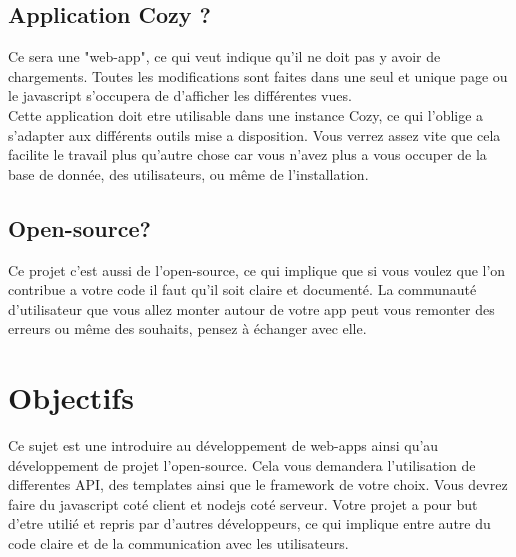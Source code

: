 \documentclass{42-fr}
\begin{document}
	\section{Application Cozy ?}

		Ce sera une "web-app", ce qui veut indique qu'il ne doit pas y avoir
		de chargements. Toutes les modifications sont faites dans une seul et
		unique page ou le javascript s'occupera de d'afficher les diff\'erentes
		vues.\\
		Cette application doit etre utilisable dans une instance Cozy, ce qui
		l'oblige a s'adapter aux diff\'erents outils mise a disposition.
		Vous verrez assez vite que cela facilite le travail plus qu'autre chose
		car vous n'avez plus a vous occuper de la base de donn\'ee, des
		utilisateurs, ou m\^eme de l'installation.


	\section{Open-source?}

		Ce projet c'est aussi de l'open-source, ce qui implique que si vous voulez
		que l'on contribue a votre code il faut qu'il soit claire et document\'e.
		La communaut\'e d'utilisateur que vous allez monter autour de votre app
		peut vous remonter des erreurs ou m\^eme des souhaits, pensez \`a \'echanger
		avec elle.



\chapter{Objectifs}


	Ce sujet est une introduire au d\'eveloppement de web-apps ainsi qu'au
	d\'eveloppement de projet l'open-source. Cela vous demandera l'utilisation de
	differentes API, des templates ainsi que le framework de votre choix. Vous devrez
	faire du javascript cot\'e client et nodejs cot\'e serveur.
	Votre projet a pour but d'etre utili\'e et repris par d'autres
	d\'eveloppeurs, ce qui implique entre autre du code claire et de la communication
	avec les utilisateurs.
\end{document}
